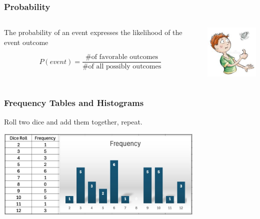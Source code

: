 \documentclass{beamer}
\begin{document}
\begin{frame}\frametitle{Probability}


\begin{columns}
\begin{column}{5cm}
The probability of an event expresses the likelihood of the event outcome

\[P(event) = \frac{\text{\# of favorable outcomes}}{\text{\# of all possibly outcomes}}\]
\end{column}
\begin{column}{5cm}
\begin{center}
\includegraphics[width=3cm]{fig/coinflip.jpg}
\end{center}
\end{column}
\end{columns}
\end{frame}

\begin{frame}\frametitle{Frequency Tables and Histograms}

\begin{center}

Roll two dice and add them together, repeat. \newline

\includegraphics[width=10cm]{fig/stat1.jpg}
\end{center}

\end{frame}
\end{document}

